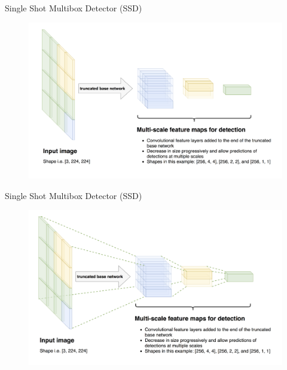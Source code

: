 \documentclass[aspectratio=169]{beamer}
\begin{document}
\begin{frame}{Single Shot Multibox Detector (SSD)}
\begin{figure}
    \centering
    \includegraphics[scale=.35]{demo/figs/ssd1.png}
\end{figure}
\end{frame}

\begin{frame}{Single Shot Multibox Detector (SSD)}
\begin{figure}
    \centering
    \includegraphics[scale=.35]{demo/figs/ssd2.png}
\end{figure}
\end{frame}
\end{document}
